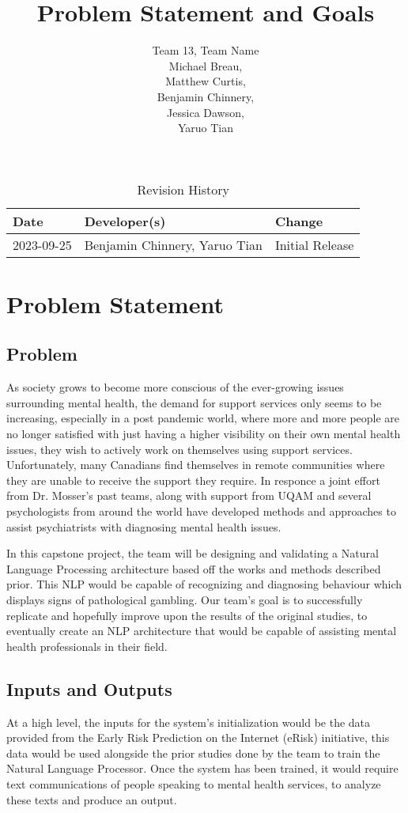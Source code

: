 \documentclass{article}
\title{Problem Statement and Goals\\\progname}
\author{Team 13, Team Name 
\\Michael Breau, \\Matthew Curtis, \\Benjamin Chinnery, \\Jessica Dawson, \\Yaruo Tian}
\date{}
\begin{document}
\maketitle

\begin{table}[hp]
\caption{Revision History} \label{TblRevisionHistory}
\begin{tabularx}{\textwidth}{llX}
\toprule
\textbf{Date} & \textbf{Developer(s)} & \textbf{Change}\\
\midrule
2023-09-25 &  Benjamin Chinnery, Yaruo Tian & Initial Release\\
\bottomrule
\end{tabularx}
\end{table}

\section{Problem Statement}

\subsection{Problem}
As society grows to become more conscious of the ever-growing issues surrounding mental health, the demand for support services only seems to be increasing, especially in a post pandemic world, where more and more people are no longer satisfied with just having a higher visibility on their own mental health issues, they wish to actively work on themselves using support services. Unfortunately, many Canadians find themselves in remote communities where they are unable to receive the support they require. In responce a joint effort from Dr. Mosser's past teams, along with support from UQAM and several psychologists from around the world have developed methods and approaches to assist psychiatrists with diagnosing mental health issues.

In this capstone project, the team will be designing and validating a Natural Language Processing architecture based off the works and methods described prior. This NLP would be capable of recognizing and diagnosing behaviour which displays signs of pathological gambling. Our team's goal is to successfully replicate and hopefully improve upon the results of the original studies, to eventually create an NLP architecture that would be capable of assisting mental health professionals in their field.

\subsection{Inputs and Outputs}
At a high level, the inputs for the system's initialization would be the data provided from the Early Risk Prediction on the Internet (eRisk) initiative, this data would be used alongside the prior studies done by the team to train the Natural Language Processor. Once the system has been trained, it would require text communications of people speaking to mental health services, to analyze these texts and produce an output.
\end{document}
